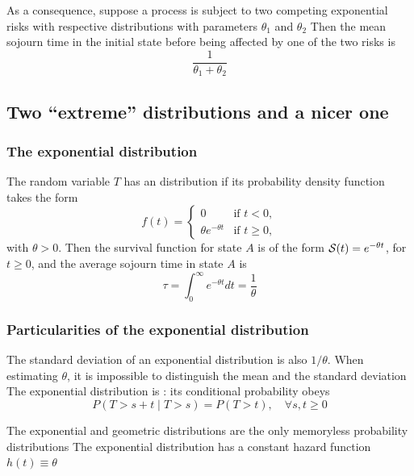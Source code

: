 \documentclass[aspectratio=169]{beamer}\usepackage[]{graphicx}\usepackage[]{xcolor}
\begin{document}
\begin{frame}
As a consequence, suppose a process is subject to two competing exponential risks with respective distributions with parameters $\theta_1$ and $\theta_2$
\vfill
Then the mean sojourn time in the initial state before being affected by one of the two risks is
$$
\frac{1}{\theta_1+\theta_2}
$$
\end{frame}


\subsection{Two ``extreme'' distributions and a nicer one}

\begin{frame}\frametitle{The exponential distribution}
The random variable $T$ has an  distribution if its
probability density function takes the form
\begin{equation}\label{eq:exp_distrib}
f(t)=\begin{cases}0&\textrm{if }t<0,\\
\theta e^{-\theta t}&\textrm{if }t\geq 0,
\end{cases}
\end{equation}
with $\theta>0$. Then the
survival function for state $A$ is of the form $\S(t)=e^{-\theta
  t}$, for $t\geq 0$, and the average sojourn time in state $A$ is
\[
\tau=\int_0^\infty e^{-\theta t}dt=\frac 1\theta
\]
\end{frame}

\begin{frame}\frametitle{Particularities of the exponential distribution}
The standard deviation of an exponential distribution is also $1/\theta$. When estimating $\theta$, it is impossible to distinguish the mean and the standard deviation
\vfill
The exponential distribution is : its conditional probability obeys
\[
P(T > s + t\; |\; T > s) = P(T > t),\quad\forall s, t \ge 0
\]

The exponential and geometric distributions are the only memoryless probability distributions
\vfill
The exponential distribution has a constant hazard function $h(t)\equiv\theta$
\end{frame}



\end{document}
